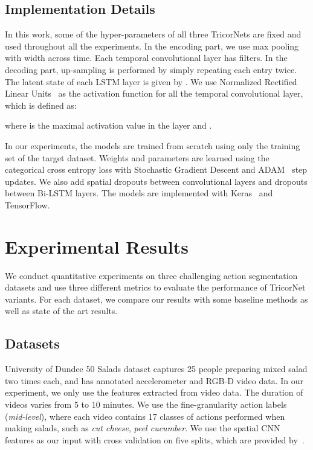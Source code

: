\documentclass{article}
\begin{document}
\subsection{Implementation Details}

In this work, some of the hyper-parameters of all three TricorNets are fixed and used throughout all the experiments. In the encoding part, we use max pooling with width  across time. Each temporal convolutional layer  has  filters. In the decoding part, up-sampling is performed by simply repeating each entry twice. The latent state of each LSTM layer  is given by . We use Normalized Rectified Linear Units~\cite{LeFlViCVPR2017} as the activation function for all the temporal convolutional layer, which is defined as:

where  is the maximal activation value in the layer and .

In our experiments, the models are trained from scratch using only the training set of the target dataset. Weights and parameters are learned using the categorical cross entropy loss with Stochastic Gradient Descent and ADAM~\cite{adam} step updates. We also add spatial dropouts between convolutional layers and dropouts between Bi-LSTM layers. The models are implemented with Keras~\cite{keras} and TensorFlow.


\section{Experimental Results}
\label{sec:exp}

We conduct quantitative experiments on three challenging action segmentation datasets and use three different metrics to evaluate the performance of TricorNet variants. For each dataset, we compare our results with some baseline methods as well as state of the art results.

\subsection{Datasets}

University of Dundee 50 Salads \cite{50salads} dataset captures 25 people preparing mixed salad two times each, and has annotated accelerometer and RGB-D video data. In our experiment, we only use the features extracted from video data. The duration of videos varies from 5 to 10 minutes. We use the fine-granularity action labels (\textit{mid-level}), where each video contains 17 classes of actions performed when making salads, such as \textit{cut cheese}, \textit{peel cucumber}. We use the spatial CNN~\cite{scnn} features as our input with cross validation on five splits, which are provided by~\cite{LeFlViCVPR2017}.
\end{document}

